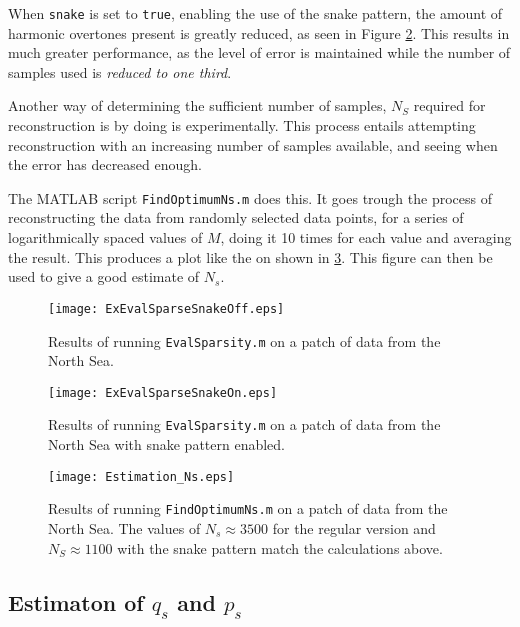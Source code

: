 \documentclass[Main]{subfiles}
\begin{document}
		When \texttt{snake} is set to \texttt{true}, enabling the use of the snake pattern, the amount of harmonic overtones present is greatly reduced, as seen in Figure \ref{fig:ExEvalSparseSnakeOn}.
		This results in much greater performance, as the level of error is maintained while the number of samples used is \emph{reduced to one third}. 

		Another way of determining the sufficient number of samples, $N_S$ required for reconstruction is by doing is experimentally.
		This process entails attempting reconstruction with an increasing number of samples available, and seeing when the error has decreased enough.

		The MATLAB script \texttt{FindOptimumNs.m} does this.
		It goes trough the process of reconstructing the data from randomly selected data points, for a series of logarithmically spaced values of $M$, doing it 10 times for each value and averaging the result.
		This produces a plot like the on shown in \ref{fig:Estimation_Ns}.
		This figure can then be used to give a good estimate of $N_s$.

		\begin{figure}[H]
			\centering 
			\texttt{[image: ExEvalSparseSnakeOff.eps]}
			\caption{
				Results of running \texttt{EvalSparsity.m} on a patch of data from the North Sea.}
			\label{fig:ExEvalSparseSnakeOff}
		\end{figure}

		\begin{figure}[H]
			\centering 
			\texttt{[image: ExEvalSparseSnakeOn.eps]}
			\caption{
				Results of running \texttt{EvalSparsity.m} on a patch of data from the North Sea with snake pattern enabled.}
			\label{fig:ExEvalSparseSnakeOn}
		\end{figure}

		\begin{figure}[H]
			\centering 
			\texttt{[image: Estimation\_Ns.eps]}
			\caption{
				Results of running \texttt{FindOptimumNs.m} on a patch of data from the North Sea. The values of $N_s \approx 3500$ for the regular version and $N_S \approx 1100$ with the snake pattern match the calculations above.}
			\label{fig:Estimation_Ns}
		\end{figure}



	

	\subsection{Estimaton of $q_s$ and $p_s$} %
	\label{sub:estimaton_of_q_s_and_p_s}
\end{document}

